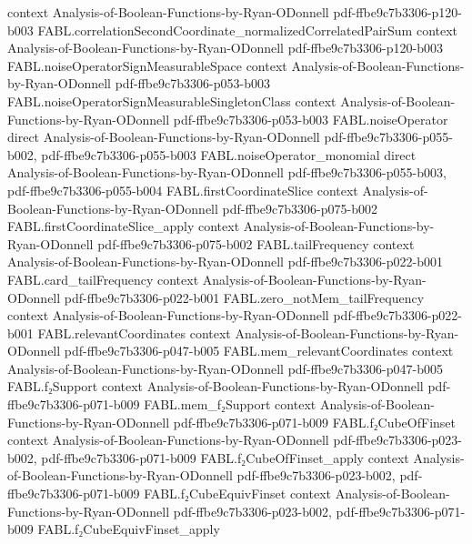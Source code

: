 \begin{theorem}
  {context}
  {Analysis-of-Boolean-Functions-by-Ryan-ODonnell}
  {pdf-ffbe9c7b3306-p120-b003}
\proofstep
  {FABL.correlationSecondCoordinate_normalizedCorrelatedPairSum}
  {context}
  {Analysis-of-Boolean-Functions-by-Ryan-ODonnell}
  {pdf-ffbe9c7b3306-p120-b003}
\proofstep
  {FABL.noiseOperatorSignMeasurableSpace}
  {context}
  {Analysis-of-Boolean-Functions-by-Ryan-ODonnell}
  {pdf-ffbe9c7b3306-p053-b003}
\proofstep
  {FABL.noiseOperatorSignMeasurableSingletonClass}
  {context}
  {Analysis-of-Boolean-Functions-by-Ryan-ODonnell}
  {pdf-ffbe9c7b3306-p053-b003}
\proofstep
  {FABL.noiseOperator}
  {direct}
  {Analysis-of-Boolean-Functions-by-Ryan-ODonnell}
  {pdf-ffbe9c7b3306-p055-b002,
    pdf-ffbe9c7b3306-p055-b003}
\proofstep
  {FABL.noiseOperator_monomial}
  {direct}
  {Analysis-of-Boolean-Functions-by-Ryan-ODonnell}
  {pdf-ffbe9c7b3306-p055-b003,
    pdf-ffbe9c7b3306-p055-b004}
\proofstep
  {FABL.firstCoordinateSlice}
  {context}
  {Analysis-of-Boolean-Functions-by-Ryan-ODonnell}
  {pdf-ffbe9c7b3306-p075-b002}
\proofstep
  {FABL.firstCoordinateSlice_apply}
  {context}
  {Analysis-of-Boolean-Functions-by-Ryan-ODonnell}
  {pdf-ffbe9c7b3306-p075-b002}
\proofstep
  {FABL.tailFrequency}
  {context}
  {Analysis-of-Boolean-Functions-by-Ryan-ODonnell}
  {pdf-ffbe9c7b3306-p022-b001}
\proofstep
  {FABL.card_tailFrequency}
  {context}
  {Analysis-of-Boolean-Functions-by-Ryan-ODonnell}
  {pdf-ffbe9c7b3306-p022-b001}
\proofstep
  {FABL.zero_notMem_tailFrequency}
  {context}
  {Analysis-of-Boolean-Functions-by-Ryan-ODonnell}
  {pdf-ffbe9c7b3306-p022-b001}
\proofstep
  {FABL.relevantCoordinates}
  {context}
  {Analysis-of-Boolean-Functions-by-Ryan-ODonnell}
  {pdf-ffbe9c7b3306-p047-b005}
\proofstep
  {FABL.mem_relevantCoordinates}
  {context}
  {Analysis-of-Boolean-Functions-by-Ryan-ODonnell}
  {pdf-ffbe9c7b3306-p047-b005}
\proofstep
  {FABL.f₂Support}
  {context}
  {Analysis-of-Boolean-Functions-by-Ryan-ODonnell}
  {pdf-ffbe9c7b3306-p071-b009}
\proofstep
  {FABL.mem_f₂Support}
  {context}
  {Analysis-of-Boolean-Functions-by-Ryan-ODonnell}
  {pdf-ffbe9c7b3306-p071-b009}
\proofstep
  {FABL.f₂CubeOfFinset}
  {context}
  {Analysis-of-Boolean-Functions-by-Ryan-ODonnell}
  {pdf-ffbe9c7b3306-p023-b002,
    pdf-ffbe9c7b3306-p071-b009}
\proofstep
  {FABL.f₂CubeOfFinset_apply}
  {context}
  {Analysis-of-Boolean-Functions-by-Ryan-ODonnell}
  {pdf-ffbe9c7b3306-p023-b002,
    pdf-ffbe9c7b3306-p071-b009}
\proofstep
  {FABL.f₂CubeEquivFinset}
  {context}
  {Analysis-of-Boolean-Functions-by-Ryan-ODonnell}
  {pdf-ffbe9c7b3306-p023-b002,
    pdf-ffbe9c7b3306-p071-b009}
\proofstep
  {FABL.f₂CubeEquivFinset_apply}

\end{theorem}
